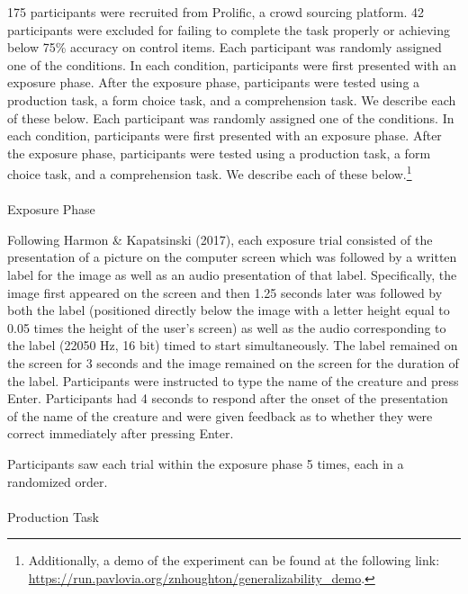 \documentclass[
  letterpaper,
  DIV=11,
  numbers=noendperiod]{scrartcl}
\makeatletter
\let\oldparagraph\paragraph
\renewcommand{\paragraph}{
    \@ifstar
      \xxxParagraphStar
      \xxxParagraphNoStar
  }
\newcommand{\xxxParagraphStar}[1]{\oldparagraph*{#1}\mbox{}}
\newcommand{\xxxParagraphNoStar}[1]{\oldparagraph{#1}\mbox{}}
\makeatother
\begin{document}
175 participants were recruited from Prolific, a crowd sourcing
platform. 42 participants were excluded for failing to complete the task
properly or achieving below 75\% accuracy on control items. Each
participant was randomly assigned one of the conditions. In each
condition, participants were first presented with an exposure phase.
After the exposure phase, participants were tested using a production
task, a form choice task, and a comprehension task. We describe each of
these below. Each participant was randomly assigned one of the
conditions. In each condition, participants were first presented with an
exposure phase. After the exposure phase, participants were tested using
a production task, a form choice task, and a comprehension task. We
describe each of these below.\footnote{Additionally, a demo of the
  experiment can be found at the following link:
  \url{https://run.pavlovia.org/znhoughton/generalizability_demo}.}

\paragraph{Exposure Phase}\label{exposure-phase}

Following Harmon \& Kapatsinski (2017), each exposure trial consisted of
the presentation of a picture on the computer screen which was followed
by a written label for the image as well as an audio presentation of
that label. Specifically, the image first appeared on the screen and
then 1.25 seconds later was followed by both the label (positioned
directly below the image with a letter height equal to 0.05 times the
height of the user's screen) as well as the audio corresponding to the
label (22050 Hz, 16 bit) timed to start simultaneously. The label
remained on the screen for 3 seconds and the image remained on the
screen for the duration of the label. Participants were instructed to
type the name of the creature and press Enter. Participants had 4
seconds to respond after the onset of the presentation of the name of
the creature and were given feedback as to whether they were correct
immediately after pressing Enter.

Participants saw each trial within the exposure phase 5 times, each in a
randomized order.

\paragraph{Production Task}\label{production-task}
\end{document}
